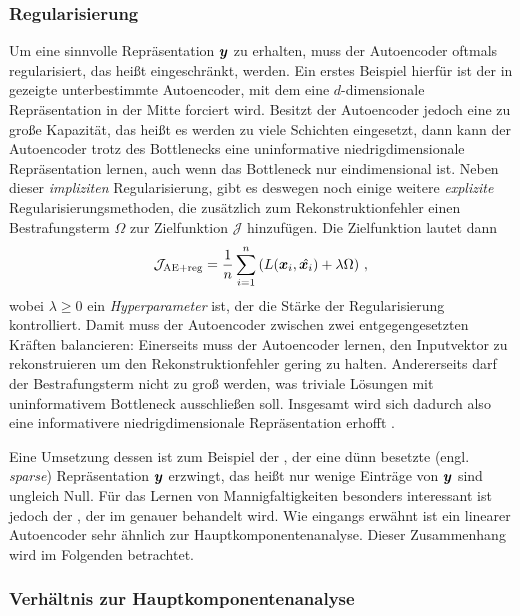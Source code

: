 \subsubsection{Regularisierung}
\label{ch:MethodenDerDimRed:ML:AE:Regularisierung}
Um eine sinnvolle Repräsentation $\bm{y}$ zu erhalten, muss der Autoencoder oftmals
regularisiert, das heißt eingeschränkt, werden. Ein erstes Beispiel hierfür ist der in
 gezeigte unterbestimmte Autoencoder, mit dem eine $d$-dimensionale
Repräsentation in der Mitte forciert wird. Besitzt der Autoencoder jedoch eine zu große Kapazität,
das heißt es werden zu viele Schichten eingesetzt, dann kann der Autoencoder trotz des Bottlenecks
eine uninformative niedrigdimensionale Repräsentation lernen, auch wenn das Bottleneck nur
eindimensional ist. Neben dieser \textit{impliziten} Regularisierung, gibt es deswegen noch einige
weitere \textit{explizite} Regularisierungsmethoden, die zusätzlich zum Rekonstruktionfehler einen
Bestrafungsterm $\Omega$ zur Zielfunktion $\mathcal{J}$ hinzufügen. Die Zielfunktion lautet dann
\begin{equation}
	\mathcal{J}_{\text{AE+reg}} = \frac{1}{n} \sum_{i = 1}^{n} \left( L(\bm{x}_i, \hat{\bm{x}_i}) + \lambda \Omega \right) \, ,
\end{equation}
wobei $\lambda \geq 0$ ein \textit{Hyperparameter} ist, der die Stärke der Regularisierung kontrolliert. Damit muss der Autoencoder zwischen zwei entgegengesetzten Kräften balancieren: Einerseits muss der Autoencoder lernen, den Inputvektor zu rekonstruieren um den Rekonstruktionfehler gering zu halten. Andererseits darf der Bestrafungsterm nicht zu groß werden, was triviale Lösungen mit uninformativem Bottleneck ausschließen soll. Insgesamt wird sich dadurch also eine informativere niedrigdimensionale Repräsentation erhofft \parencite[516]{Goodfellow.2016}.

Eine Umsetzung dessen ist zum Beispiel der , der eine dünn besetzte
(engl. \textit{sparse}) Repräsentation $\bm{y}$ erzwingt, das heißt nur wenige Einträge von
$\bm{y}$ sind ungleich Null. Für das Lernen von Mannigfaltigkeiten besonders interessant ist
jedoch der  \parencite{Rifai.2011}, der im  genauer behandelt wird. Wie
eingangs erwähnt ist ein linearer Autoencoder sehr ähnlich zur Hauptkomponentenanalyse. Dieser
Zusammenhang wird im Folgenden betrachtet.

\subsubsection{Verhältnis zur Hauptkomponentenanalyse}
\label{ch:MethodenDerDimRed:ML:AE:VerhaeltnisPCA}

